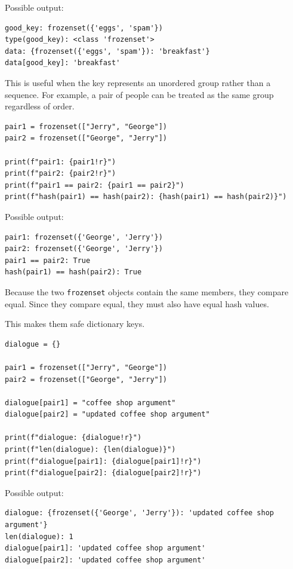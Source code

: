 Possible output:

\begin{verbatim}
good_key: frozenset({'eggs', 'spam'})
type(good_key): <class 'frozenset'>
data: {frozenset({'eggs', 'spam'}): 'breakfast'}
data[good_key]: 'breakfast'
\end{verbatim}

This is useful when the key represents an unordered group rather than a sequence. For example, a pair of people can be treated as the same group regardless of order.

\begin{verbatim}
pair1 = frozenset(["Jerry", "George"])
pair2 = frozenset(["George", "Jerry"])

print(f"pair1: {pair1!r}")
print(f"pair2: {pair2!r}")
print(f"pair1 == pair2: {pair1 == pair2}")
print(f"hash(pair1) == hash(pair2): {hash(pair1) == hash(pair2)}")
\end{verbatim}

Possible output:

\begin{verbatim}
pair1: frozenset({'George', 'Jerry'})
pair2: frozenset({'George', 'Jerry'})
pair1 == pair2: True
hash(pair1) == hash(pair2): True
\end{verbatim}

Because the two \texttt{frozenset} objects contain the same members, they compare equal. Since they compare equal, they must also have equal hash values.

This makes them safe dictionary keys.

\begin{verbatim}
dialogue = {}

pair1 = frozenset(["Jerry", "George"])
pair2 = frozenset(["George", "Jerry"])

dialogue[pair1] = "coffee shop argument"
dialogue[pair2] = "updated coffee shop argument"

print(f"dialogue: {dialogue!r}")
print(f"len(dialogue): {len(dialogue)}")
print(f"dialogue[pair1]: {dialogue[pair1]!r}")
print(f"dialogue[pair2]: {dialogue[pair2]!r}")
\end{verbatim}

Possible output:

\begin{verbatim}
dialogue: {frozenset({'George', 'Jerry'}): 'updated coffee shop argument'}
len(dialogue): 1
dialogue[pair1]: 'updated coffee shop argument'
dialogue[pair2]: 'updated coffee shop argument'
\end{verbatim}

